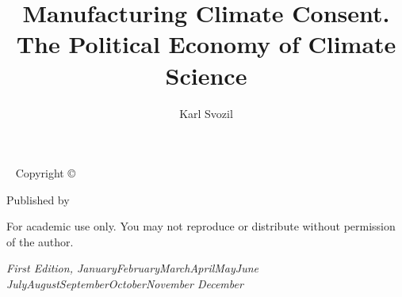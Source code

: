 \documentclass[a4paper]{tufte-book}
\title{Manufacturing Climate Consent. The Political Economy of Climate Science}
\author[Karl Svozil]{Karl Svozil}
\renewcommand{\smallcaps}[1]{\color{Grey} \sffamily #1}
\newcommand{\monthyear}{%
  \ifcase\month\or January\or February\or March\or April\or May\or June\or
  July\or August\or September\or October\or November\or
  December\fi\space\number\year
}
\newcommand{\blankpage}{\newpage\hbox{}\thispagestyle{empty}\newpage}
\begin{document}
\sloppy







\maketitle


\newpage
\begin{fullwidth}
~\vfill
\thispagestyle{empty}
\setlength{\parindent}{0pt}
\setlength{\parskip}{\baselineskip}
Copyright \copyright\ \the\year\ \thanklessauthor

\par\smallcaps{Published by \thanklesspublisher}

\par For academic use only. You may not reproduce or distribute without permission of the author.

\par\textit{First Edition,  \monthyear}
\end{fullwidth}



\tableofcontents











\mainmatter
\thispagestyle{fancy}
\end{document}

